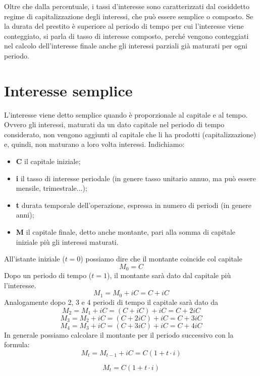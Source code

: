 Oltre che dalla percentuale, i tassi d'interesse sono caratterizzati dal 
cosiddetto regime di capitalizzazione degli interessi, che può essere semplice 
o composto. Se la durata del prestito è superiore al periodo di tempo per cui 
l'interesse viene conteggiato, si parla di tasso di interesse composto, perché 
vengono conteggiati nel calcolo dell'interesse finale anche gli interessi 
parziali già maturati per ogni periodo.

\section{Interesse semplice}
L'interesse viene detto semplice quando è proporzionale al capitale e al tempo. 
Ovvero gli interessi, maturati da un dato capitale nel periodo di tempo 
considerato, non vengono aggiunti al capitale che li ha prodotti 
(capitalizzazione) e, quindi, non maturano a loro volta interessi. Indichiamo:

\begin{itemize}
\item \textbf{C} il capitale iniziale;
\item \textbf{i} il tasso di interesse periodale (in genere tasso unitario annuo, ma 
può essere mensile, trimestrale...);
\item \textbf{t} durata temporale dell'operazione, espressa in numero di periodi (in 
genere anni);
\item \textbf{M} il capitale finale, detto anche montante, pari alla somma di capitale 
iniziale più gli interessi maturati. 
\end{itemize}

All'istante iniziale ($t=0$) possiamo dire che il montante coincide col 
capitale $$ M_{0}=C $$
Dopo un periodo di tempo ($t=1$), il montante sarà dato dal capitale più 
l'interesse. 
$$ M_{1}=M_{0} +iC = C + iC $$
Analogamente dopo 2, 3 e 4 periodi di tempo il capitale sarà dato da 
$$ M_{2}=M_{1} +iC = (C + iC) +iC = C +2iC$$
$$ M_{3}=M_{2} +iC = (C + 2iC) +iC = C +3iC$$
$$ M_{4}=M_{3} +iC = (C + 3iC) +iC = C +4iC$$
In generale possiamo calcolare il montante per il periodo successivo con la 
formula:
$$ M_{t}=M_{t-1}+iC=C(1+t\cdot i) $$
\begin{definizione}
$$ M_{t}=C(1+t\cdot i) $$
\end{definizione}

